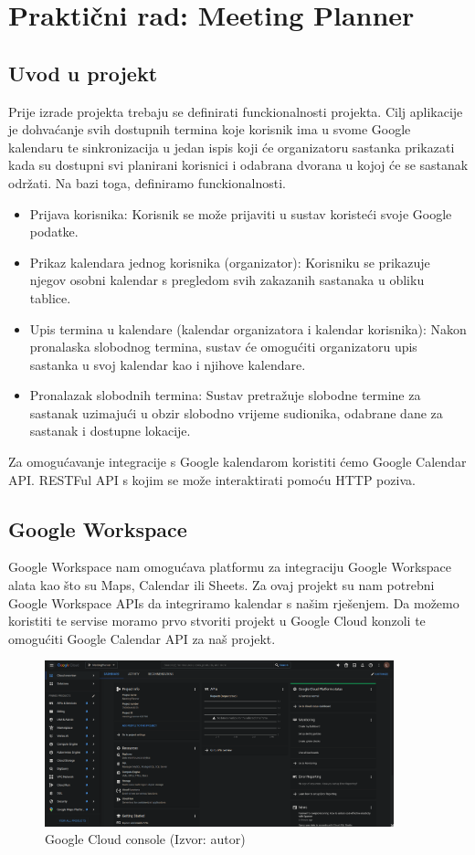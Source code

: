\documentclass{foi}
\begin{document}
\chapter{Praktični rad: Meeting Planner}
\section{Uvod u projekt}
Prije izrade projekta trebaju se definirati funckionalnosti projekta. Cilj aplikacije je dohvaćanje svih dostupnih termina koje korisnik ima u svome Google kalendaru te sinkronizacija u jedan ispis koji će organizatoru sastanka prikazati kada su dostupni svi planirani korisnici i odabrana dvorana u kojoj će se sastanak održati. 
Na bazi toga, definiramo funckionalnosti.
\begin{itemize}
    \item Prijava korisnika: Korisnik se može prijaviti u sustav koristeći svoje Google podatke.
    \item Prikaz kalendara jednog korisnika (organizator): Korisniku se prikazuje njegov osobni kalendar s pregledom svih zakazanih sastanaka u obliku tablice.
    \item Upis termina u kalendare (kalendar organizatora i kalendar korisnika): Nakon pronalaska slobodnog termina, sustav će omogućiti organizatoru upis sastanka u svoj kalendar kao i njihove kalendare.
    \item Pronalazak slobodnih termina: Sustav pretražuje slobodne termine za sastanak uzimajući u obzir slobodno vrijeme sudionika, odabrane dane za sastanak i dostupne lokacije.
\end{itemize}
Za omogućavanje integracije s Google kalendarom koristiti ćemo Google Calendar API. RESTFul API s kojim se može interaktirati pomoću HTTP poziva.
\section{Google Workspace}
Google Workspace nam omogućava platformu za integraciju Google Workspace alata kao što su Maps, Calendar ili Sheets. Za ovaj projekt su nam potrebni Google Workspace APIs da integriramo kalendar s našim rješenjem.
Da možemo koristiti te servise moramo prvo stvoriti projekt u Google Cloud konzoli te omogućiti Google Calendar API za naš projekt.
\begin{figure}[H]
    \centering
    \includegraphics[width=0.9\textwidth]{slike/google_console.png}
    \caption{Google Cloud console (Izvor: autor)}
    \label{fig:google_console}
\end{figure}
\end{document}
